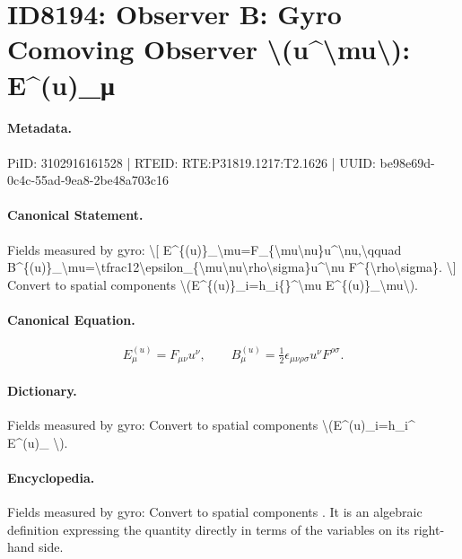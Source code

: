 \section*{ID8194: Observer B: Gyro Comoving Observer \textbackslash{}(u\textasciicircum{}\textbackslash{}mu\textbackslash{}): E\textasciicircum{}(u)\_μ}
\paragraph{Metadata.}
PiID: 3102916161528 | RTEID: RTE:P31819.1217:T2.1626 | UUID: be98e69d-0c4c-55ad-9ea8-2be48a703c16

\paragraph{Canonical Statement.}
Fields measured by gyro: \textbackslash{}[ E\textasciicircum{}\{(u)\}\_\textbackslash{}mu=F\_\{\textbackslash{}mu\textbackslash{}nu\}u\textasciicircum{}\textbackslash{}nu,\textbackslash{}qquad B\textasciicircum{}\{(u)\}\_\textbackslash{}mu=\textbackslash{}tfrac12\textbackslash{}epsilon\_\{\textbackslash{}mu\textbackslash{}nu\textbackslash{}rho\textbackslash{}sigma\}u\textasciicircum{}\textbackslash{}nu F\textasciicircum{}\{\textbackslash{}rho\textbackslash{}sigma\}. \textbackslash{}] Convert to spatial components \textbackslash{}(E\textasciicircum{}\{(u)\}\_i=h\_i\{\}\textasciicircum{}\textbackslash{}mu E\textasciicircum{}\{(u)\}\_\textbackslash{}mu\textbackslash{}).

\paragraph{Canonical Equation.}
\[
E^{(u)}_\mu=F_{\mu\nu}u^\nu,\qquad B^{(u)}_\mu=\tfrac12\epsilon_{\mu\nu\rho\sigma}u^\nu F^{\rho\sigma}.
\]

\paragraph{Dictionary.}
Fields measured by gyro: Convert to spatial components \textbackslash{}(E\textasciicircum{}(u)\_i=h\_i\textasciicircum{} E\textasciicircum{}(u)\_ \textbackslash{}).

\paragraph{Encyclopedia.}
Fields measured by gyro: Convert to spatial components . It is an algebraic definition expressing the quantity directly in terms of the variables on its right-hand side.

